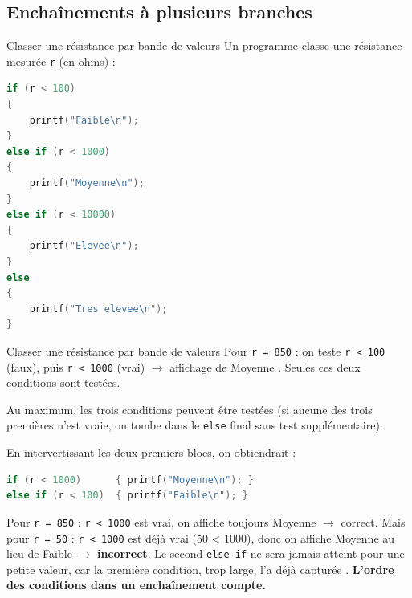 \subsection{Enchaînements à plusieurs branches}

\begin{UPSTIexercice}{Classer une résistance par bande de valeurs}
    Un programme classe une résistance mesurée \texttt{r} (en ohms) :
    \begin{lstlisting}[language=C]
if (r < 100)
{
    printf("Faible\n");
}
else if (r < 1000)
{
    printf("Moyenne\n");
}
else if (r < 10000)
{
    printf("Elevee\n");
}
else
{
    printf("Tres elevee\n");
}
    \end{lstlisting}
\end{UPSTIexercice}

\begin{UPSTIprofOnlyEnv}
    \begin{UPSTIcorrectionP}{Classer une résistance par bande de valeurs}
        Pour \texttt{r = 850} : on teste \texttt{r < 100} (faux), puis \texttt{r < 1000} (vrai) $\to$ affichage de \og Moyenne \fg. Seules ces deux conditions sont testées.

        Au maximum, les trois conditions peuvent être testées (si aucune des trois premières n'est vraie, on tombe dans le \texttt{else} final sans test supplémentaire).

        En intervertissant les deux premiers blocs, on obtiendrait :
        \begin{lstlisting}[language=C]
if (r < 1000)      { printf("Moyenne\n"); }
else if (r < 100)  { printf("Faible\n"); }
        \end{lstlisting}
        Pour \texttt{r = 850} : \texttt{r < 1000} est vrai, on affiche toujours \og Moyenne \fg{} $\to$ correct. Mais pour \texttt{r = 50} : \texttt{r < 1000} est déjà vrai (50 < 1000), donc on affiche \og Moyenne \fg{} au lieu de \og Faible \fg{} $\to$ \textbf{incorrect}. Le second \texttt{else if} ne sera jamais atteint pour une petite valeur, car la première condition, trop large, l'a déjà \og capturée \fg. \textbf{L'ordre des conditions dans un enchaînement compte.}
    \end{UPSTIcorrectionP}
\end{UPSTIprofOnlyEnv}



